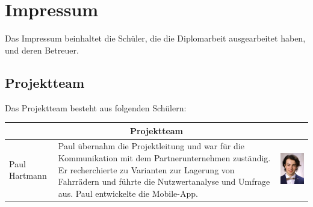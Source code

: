 \section{Impressum}
Das Impressum beinhaltet die Schüler, die die Diplomarbeit ausgearbeitet haben, und deren Betreuer.
\subsection{Projektteam}
Das Projektteam besteht aus folgenden Schülern:

\bigskip

\begin{table}[H]
  \centering
  \begin{tabular}{lp{}c}
    \multicolumn{3}{c}{\textbf{Projektteam}}                                                                                                                                                                                                                                                                                                                                                     \\
    \toprule
    Paul Hartmann & Paul übernahm die Projektleitung und war für die Kommunikation mit dem Partnerunternehmen zuständig. Er recherchierte zu Varianten zur Lagerung von Fahrrädern und führte die Nutzwertanalyse und Umfrage aus. Paul entwickelte die Mobile-App.          & \begin{minipage}{.2\textwidth}\centering\includegraphics[width=\textwidth]{images/paulhartmann.jpg}\end{minipage} \\

\end{tabular}
\end{table}
